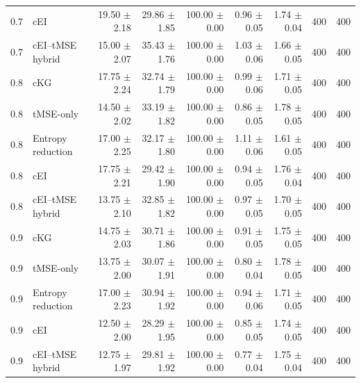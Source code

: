 \begin{tabular}{@{}clrrrrrrr@{}}
0.7 & cEI & 19.50 $\pm$ 2.18 & 29.86 $\pm$ 1.85 & 100.00 $\pm$ 0.00 & 0.96 $\pm$ 0.05 & 1.74 $\pm$ 0.04 & 400 & 400 \\
0.7 & cEI--tMSE hybrid & 15.00 $\pm$ 2.07 & 35.43 $\pm$ 1.76 & 100.00 $\pm$ 0.00 & 1.03 $\pm$ 0.06 & 1.66 $\pm$ 0.05 & 400 & 400 \\
0.8 & cKG & 17.75 $\pm$ 2.24 & 32.74 $\pm$ 1.79 & 100.00 $\pm$ 0.00 & 0.99 $\pm$ 0.06 & 1.71 $\pm$ 0.05 & 400 & 400 \\
0.8 & tMSE-only & 14.50 $\pm$ 2.02 & 33.19 $\pm$ 1.82 & 100.00 $\pm$ 0.00 & 0.86 $\pm$ 0.05 & 1.78 $\pm$ 0.05 & 400 & 400 \\
0.8 & Entropy reduction & 17.00 $\pm$ 2.25 & 32.17 $\pm$ 1.80 & 100.00 $\pm$ 0.00 & 1.11 $\pm$ 0.06 & 1.61 $\pm$ 0.05 & 400 & 400 \\
0.8 & cEI & 17.75 $\pm$ 2.21 & 29.42 $\pm$ 1.90 & 100.00 $\pm$ 0.00 & 0.94 $\pm$ 0.05 & 1.76 $\pm$ 0.04 & 400 & 400 \\
0.8 & cEI--tMSE hybrid & 13.75 $\pm$ 2.10 & 32.85 $\pm$ 1.82 & 100.00 $\pm$ 0.00 & 0.97 $\pm$ 0.05 & 1.70 $\pm$ 0.05 & 400 & 400 \\
0.9 & cKG & 14.75 $\pm$ 2.03 & 30.71 $\pm$ 1.86 & 100.00 $\pm$ 0.00 & 0.91 $\pm$ 0.05 & 1.75 $\pm$ 0.05 & 400 & 400 \\
0.9 & tMSE-only & 13.75 $\pm$ 2.00 & 30.07 $\pm$ 1.91 & 100.00 $\pm$ 0.00 & 0.80 $\pm$ 0.04 & 1.78 $\pm$ 0.05 & 400 & 400 \\
0.9 & Entropy reduction & 17.00 $\pm$ 2.23 & 30.94 $\pm$ 1.92 & 100.00 $\pm$ 0.00 & 0.94 $\pm$ 0.06 & 1.71 $\pm$ 0.05 & 400 & 400 \\
0.9 & cEI & 12.50 $\pm$ 2.00 & 28.29 $\pm$ 1.95 & 100.00 $\pm$ 0.00 & 0.85 $\pm$ 0.05 & 1.74 $\pm$ 0.05 & 400 & 400 \\
0.9 & cEI--tMSE hybrid & 12.75 $\pm$ 1.97 & 29.81 $\pm$ 1.92 & 100.00 $\pm$ 0.00 & 0.77 $\pm$ 0.04 & 1.75 $\pm$ 0.04 & 400 & 400 \\
\bottomrule
\end{tabular}
\smallskip

